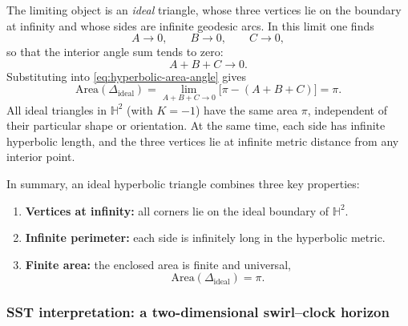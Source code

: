 \documentclass[10pt,reprint,aps,onecolumn,nofootinbib]{revtex4-2}
\begin{document}
        The limiting object is an \emph{ideal} triangle, whose three vertices lie on the boundary at infinity and whose sides are infinite geodesic arcs. In this limit one finds
        \begin{equation}
            A \to 0, \qquad B \to 0, \qquad C \to 0,
        \end{equation}
        so that the interior angle sum tends to zero:
        \begin{equation}
            A + B + C \longrightarrow 0.
        \end{equation}
        Substituting into \eqref{eq:hyperbolic-area-angle} gives
        \begin{equation}
            \text{Area}(\Delta_{\text{ideal}}) = \lim_{A+B+C \to 0} \bigl[\pi - (A + B + C)\bigr]
            = \pi.
            \label{eq:ideal-triangle-area}
        \end{equation}
        All ideal triangles in $\mathbb{H}^2$ (with $K=-1$) have the same area $\pi$, independent of their particular shape or orientation. At the same time, each side has infinite hyperbolic length, and the three vertices lie at infinite metric distance from any interior point.

        In summary, an ideal hyperbolic triangle combines three key properties:
        \begin{enumerate}
            \item \textbf{Vertices at infinity:} all corners lie on the ideal boundary of $\mathbb{H}^2$.
            \item \textbf{Infinite perimeter:} each side is infinitely long in the hyperbolic metric.
            \item \textbf{Finite area:} the enclosed area is finite and universal,
            \begin{equation}
                \text{Area}(\Delta_{\text{ideal}}) = \pi.
            \end{equation}
        \end{enumerate}

    \subsubsection{SST interpretation: a two-dimensional swirl--clock horizon}
\end{document}
